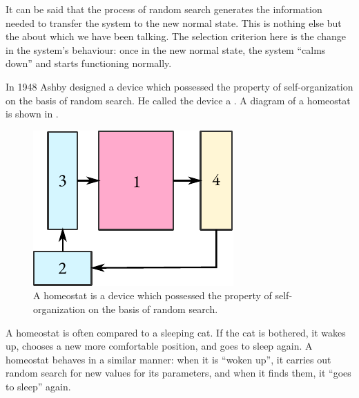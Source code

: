 It can be said that the process of random search generates the
information needed to transfer the system to the new normal state. This
is nothing else but the  about which we have been talking. The selection criterion here is the change in the
system's behaviour: once in the new normal state, the system ``calms
down'' and starts functioning normally.

In 1948 Ashby designed a device which possessed the property of
self-organization on the basis of random search. He called the device
a . A diagram of a homeostat is shown in .
\begin{figure}%
 \centering
 \includegraphics[width=0.9\linewidth]{figures/homeostat.pdf}
\caption{A homeostat is a device which possessed the property of
self-organization on the basis of random search.\label{homeostat}}
 \end{figure}
A homeostat is often compared to a sleeping cat. If the cat is bothered,
it wakes up, chooses a new more comfortable position, and goes to sleep
again. A homeostat behaves in a similar manner: when it is ``woken up'',
it carries out random search for new values for its parameters, and when
it finds them, it ``goes to sleep'' again.

